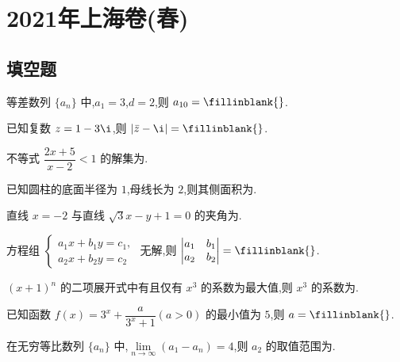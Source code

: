 \chapter{2021年上海卷(春)}

\section{填空题}

\begin{problem}
等差数列 \(\{a_n\}\) 中,\(a_1=3\),\(d=2\),则 \(a_{10}=\fillinblank{}\).
\end{problem}

\begin{problem}
已知复数 \(z=1-3\i\),则 \(|\bar z-\i|=\fillinblank{}\).
\end{problem}

\begin{problem}
不等式 \(\dfrac{2x+5}{x-2}<1\) 的解集为\fillinblank{}.
\end{problem}

\begin{problem}
已知圆柱的底面半径为 \(1\),母线长为 \(2\),则其侧面积为\fillinblank{}.
\end{problem}

\begin{problem}
直线 \(x=-2\) 与直线 \(\sqrt3x-y+1=0\) 的夹角为\fillinblank{}.
\end{problem}

\begin{problem}
方程组 \(\begin{cases}
a_1x+b_1y=c_1,\\
a_2x+b_2y=c_2
\end{cases}\) 无解,则 \(\begin{vmatrix}a_1&b_1\\a_2&b_2\end{vmatrix}=\fillinblank{}\).
\end{problem}

\begin{problem}
\((x+1)^n\) 的二项展开式中有且仅有 \(x^3\) 的系数为最大值,则 \(x^3\) 的系数为\fillinblank{}.
\end{problem}

\begin{problem}
已知函数 \(f(x)=3^x+\dfrac{a}{3^x+1}(a>0)\) 的最小值为 \(5\),则 \(a=\fillinblank{}\).
\end{problem}

\begin{problem}
在无穷等比数列 \(\{a_n\}\) 中,\(\lim\limits_{n\to\infty}(a_1-a_n)=4\),则 \(a_2\) 的取值范围为\fillinblank{}.
\end{problem}


